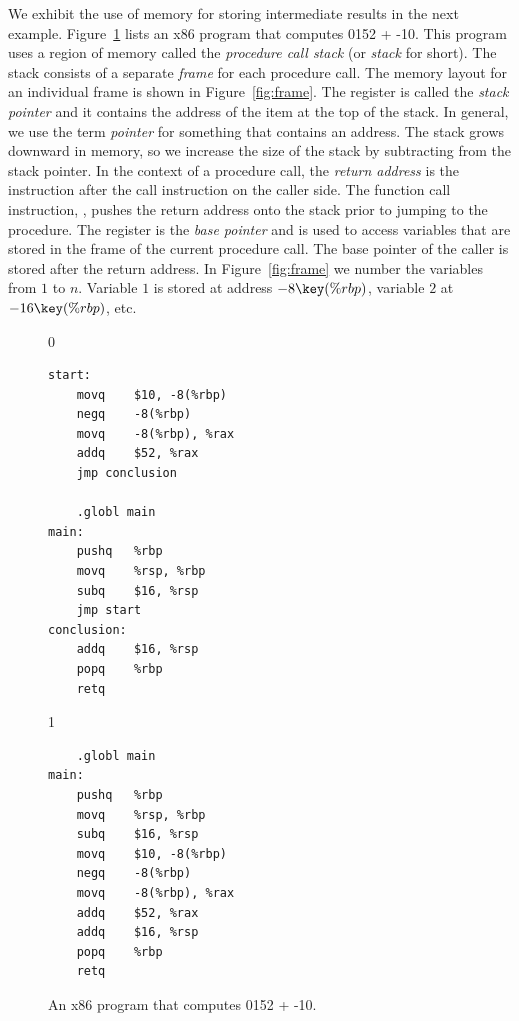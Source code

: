 \documentclass[7x10,nocrop]{TimesAPriori_MIT}%
\def\racketEd{0}
\def\pythonEd{1}
\def\edition{0}
\newcommand{\racket}[1]{{\if\edition\racketEd{#1}\fi}}
\newcommand{\python}[1]{{\if\edition\pythonEd #1\fi}}
\begin{document}
We exhibit the use of memory for storing intermediate results in the
next example.  Figure~\ref{fig:p1-x86} lists an x86 program that
computes \racket{}\python{52 + -10}. This program
uses a region of memory called the \emph{procedure call stack} (or
\emph{stack} for
short). 
The stack consists of a separate \emph{frame}
for each procedure call. The memory layout for an individual frame is
shown in Figure~\ref{fig:frame}.  The register  is called the
\emph{stack pointer} and it contains the
address of the item at the top of the stack.  In general, we use the
term \emph{pointer} for something that
contains an address. The stack grows downward in memory, so we
increase the size of the stack by subtracting from the stack pointer.
In the context of a procedure call, the \emph{return
  address} is the instruction after the
call instruction on the caller side. The function call instruction,
, pushes the return address onto the stack prior to
jumping to the procedure.  The register  is the \emph{base
  pointer} and is used to access
variables that are stored in the frame of the current procedure call.
The base pointer of the caller is stored after the return address. In
Figure~\ref{fig:frame} we number the variables from $1$ to
$n$. Variable $1$ is stored at address $-8\key{(\%rbp)}$, variable $2$
at $-16\key{(\%rbp)}$, etc.

\begin{figure}[tbp]
{\if\edition\racketEd
\begin{lstlisting}
start:
	movq	$10, -8(%rbp)
	negq	-8(%rbp)
	movq	-8(%rbp), %rax
	addq	$52, %rax
	jmp conclusion

	.globl main
main:
	pushq	%rbp
	movq	%rsp, %rbp
	subq	$16, %rsp
	jmp start
conclusion:
	addq	$16, %rsp
	popq	%rbp
	retq
\end{lstlisting}
\fi}
{\if\edition\pythonEd
\begin{lstlisting}
	.globl main
main:
	pushq	%rbp
	movq	%rsp, %rbp
	subq	$16, %rsp
	movq	$10, -8(%rbp)
	negq	-8(%rbp)
	movq	-8(%rbp), %rax
	addq	$52, %rax
	addq	$16, %rsp
	popq	%rbp
	retq
\end{lstlisting}
\fi}
\caption{An x86 program that computes
  \racket{}\python{52 + -10}.}
\label{fig:p1-x86}
\end{figure}
\end{document}
